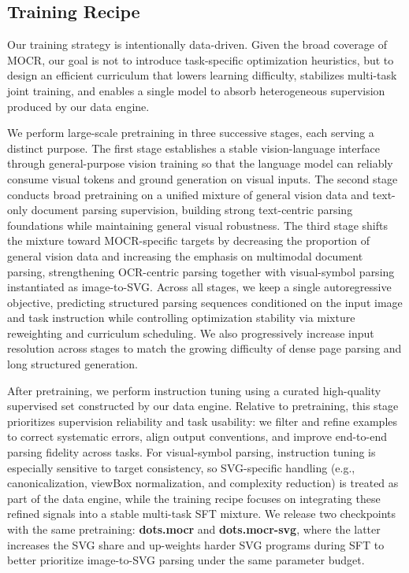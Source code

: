 \documentclass{article}
\begin{document}
\subsection{Training Recipe}
\label{sec:training_recipe}
    Our training strategy is intentionally data-driven. Given the broad coverage of MOCR, our goal is not to introduce task-specific optimization heuristics, but to design an efficient curriculum that lowers learning difficulty, stabilizes multi-task joint training, and enables a single model to absorb heterogeneous supervision produced by our data engine.

    We perform large-scale pretraining in three successive stages, each serving a distinct purpose. The first stage establishes a stable vision-language interface through general-purpose vision training so that the language model can reliably consume visual tokens and ground generation on visual inputs. The second stage conducts broad pretraining on a unified mixture of general vision data and text-only document parsing supervision, building strong text-centric parsing foundations while maintaining general visual robustness. The third stage shifts the mixture toward MOCR-specific targets by decreasing the proportion of general vision data and increasing the emphasis on multimodal document parsing, strengthening OCR-centric parsing together with visual-symbol parsing instantiated as image-to-SVG. Across all stages, we keep a single autoregressive objective, predicting structured parsing sequences conditioned on the input image and task instruction while controlling optimization stability via mixture reweighting and curriculum scheduling. We also progressively increase input resolution across stages to match the growing difficulty of dense page parsing and long structured generation.

    After pretraining, we perform instruction tuning using a curated high-quality supervised set constructed by our data engine. Relative to pretraining, this stage prioritizes supervision reliability and task usability: we filter and refine examples to correct systematic errors, align output conventions, and improve end-to-end parsing fidelity across tasks. For visual-symbol parsing, instruction tuning is especially sensitive to target consistency, so SVG-specific handling (e.g., canonicalization, viewBox normalization, and complexity reduction) is treated as part of the data engine, while the training recipe focuses on integrating these refined signals into a stable multi-task SFT mixture. We release two checkpoints with the same pretraining: \textbf{dots.mocr} and \textbf{dots.mocr-svg}, where the latter increases the SVG share and up-weights harder SVG programs during SFT to better prioritize image-to-SVG parsing under the same parameter budget.
\end{document}
